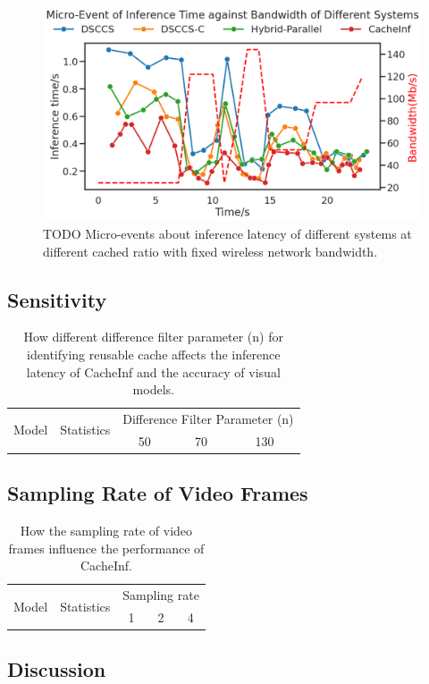 \begin{figure}
    \includegraphics[width=0.98\linewidth]{fig/MicroEvent2.png}
    \caption[short]{TODO Micro-events about inference latency of different systems at different cached ratio with fixed wireless network bandwidth.}
\end{figure}

\subsection{Sensitivity}

\begin{table}[htb]
    \begin{tabular}{c|c|c|c|c}
        \toprule
        \multirow[c]{2}{*}{Model} & \multirow[c]{2}{*}{Statistics} & \multicolumn{3}{c}{Difference Filter Parameter (n)} \\
        \cline{3-5}
        & & 50 & 70 & 130 \\
        \midrule
        \bottomrule

    \end{tabular}
    \caption[accuracy]{How different difference filter parameter (n) for identifying reusable cache affects the inference latency of CacheInf and the accuracy of visual models.}
\end{table}

\subsection{Sampling Rate of Video Frames}

\begin{table}[htb]
    \begin{tabular}{c|c|c|c|c}
        \toprule
        \multirow[c]{2}{*}{Model} & \multirow[c]{2}{*}{Statistics} & \multicolumn{3}{|c}{Sampling rate} \\
        \cline{3-5}
        & & 1 & 2 & 4 \\
        \midrule
        \bottomrule

    \end{tabular}
    \caption[sample rates]{How the sampling rate of video frames influence the performance of CacheInf.}
\end{table}

\subsection{Discussion}